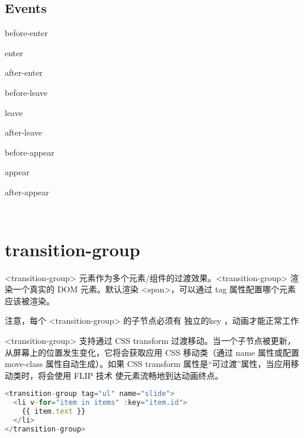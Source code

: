 \subsection{Events}


\begin{compactitem}
\item before-enter
\item enter
\item after-enter
\item before-leave
\item leave
\item after-leave
\item before-appear
\item appear
\item after-appear
\end{compactitem}








\begin{lstlisting}[language=JavaScript]

\end{lstlisting}




\begin{lstlisting}[language=JavaScript]

\end{lstlisting}




\section{transition-group}



<transition-group> 元素作为多个元素/组件的过渡效果。<transition-group> 渲染一个真实的 DOM 元素。默认渲染 <span>，可以通过 tag 属性配置哪个元素应该被渲染。

注意，每个 <transition-group> 的子节点必须有 独立的key ，动画才能正常工作


<transition-group> 支持通过 CSS transform 过渡移动。当一个子节点被更新，从屏幕上的位置发生变化，它将会获取应用 CSS 移动类（通过 name 属性或配置 move-class 属性自动生成）。如果 CSS transform 属性是“可过渡”属性，当应用移动类时，将会使用 FLIP 技术 使元素流畅地到达动画终点。

\begin{lstlisting}[language=JavaScript]
<transition-group tag="ul" name="slide">
  <li v-for="item in items" :key="item.id">
    {{ item.text }}
  </li>
</transition-group>
\end{lstlisting}


